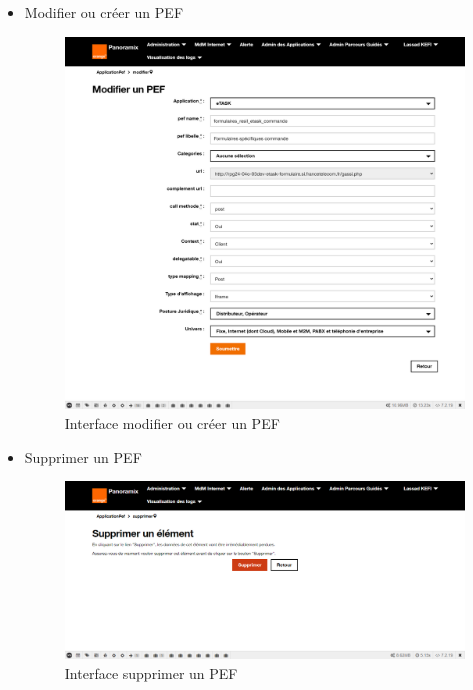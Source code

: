 \begin{itemize}
	\item Modifier ou créer un PEF
	\begin{figure}[H]
		\centering
		\includegraphics[width=0.7\linewidth]{img/screenshots/pef/edit}
		\caption[Interface modifier ou créer un PEF]{Interface modifier ou créer un PEF}
		\label{fig:create-pef}
	\end{figure}
	
	\item Supprimer un PEF
	\begin{figure}[H]
		\centering
		\includegraphics[width=0.7\linewidth]{img/screenshots/pef/delete}
		\caption[Interface supprimer un PEF]{Interface supprimer un PEF}
		\label{fig:delete-pef}
	\end{figure}
\end{itemize}
\newpage

